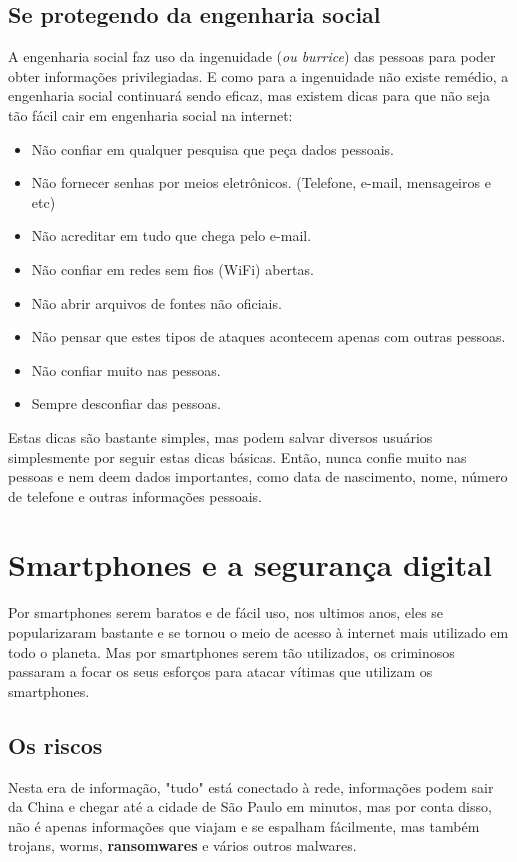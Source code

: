 \documentclass[12pt, letterpaper]{report}
\begin{document}
\subsection{Se protegendo da engenharia social}
	A engenharia social faz uso da ingenuidade (\textit{ou burrice}) das pessoas para poder obter informações privilegiadas. E como para a ingenuidade não existe remédio, a engenharia social continuará sendo eficaz, mas existem dicas para que não seja tão fácil cair em engenharia social na internet:

\begin{itemize}
	\item Não confiar em qualquer pesquisa que peça dados pessoais.
	\item Não fornecer senhas por meios eletrônicos. (Telefone, e-mail, mensageiros e etc)
	\item Não acreditar em tudo que chega pelo e-mail.
	\item Não confiar em redes sem fios (WiFi) abertas.
	\item Não abrir arquivos de fontes não oficiais.
	\item Não pensar que estes tipos de ataques acontecem apenas com outras pessoas.
	\item Não confiar muito nas pessoas.
	\item Sempre desconfiar das pessoas.
\end{itemize}

	Estas dicas são bastante simples, mas podem salvar diversos usuários simplesmente por seguir estas dicas básicas. Então, nunca confie muito nas pessoas e nem deem dados importantes, como data de nascimento, nome, número de telefone e outras informações pessoais.\\

\pagebreak

\section*{Smartphones e a segurança digital}
	Por smartphones serem baratos e de fácil uso, nos ultimos anos, eles se popularizaram bastante e se tornou o meio de acesso à internet mais utilizado em todo o planeta. Mas por smartphones serem tão utilizados, os criminosos passaram a focar os seus esforços para atacar vítimas que utilizam os smartphones.\\

\subsection{Os riscos}
	Nesta era de informação, "tudo" está conectado à rede, informações podem sair da China e chegar até a cidade de São Paulo em minutos, mas por conta disso, não é apenas informações que viajam e se espalham fácilmente, mas também trojans, worms, \textbf{ransomwares} e vários outros malwares.\\
\end{document}
